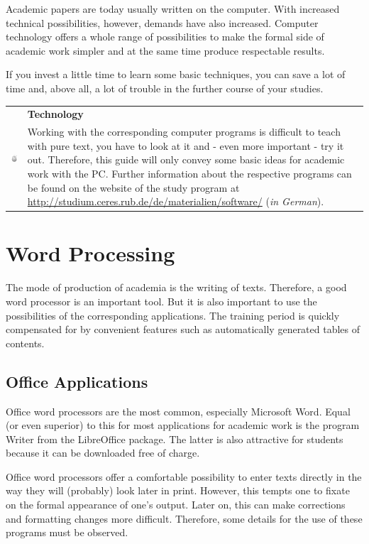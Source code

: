 \documentclass[
  english,
]{scrreprt}
\newlength{\iconwidth}
\newenvironment{displaybox}[2]{%
    \begin{center}
        \setlength\arrayrulewidth{0.75pt}%
        \arrayrulecolor{white}%
        \renewcommand{\arraystretch}{1.3}%
        \begin{tabular}{p{\iconwidth}p{\linewidth-4\tabcolsep-\iconwidth}}
            \multirow{2}{*}{#2}&\cellcolor{boxheadcol}\textbf{\sffamily\color{white}#1} \\%
            \hhline{~-}%
            &\cellcolor{boxcol}%
}{%
            \\
        \end{tabular}
        \arrayrulecolor{black}
    \end{center}
}
\newenvironment{Technology}{%
\begin{displaybox}{Technology}{\includegraphics[width=\iconwidth]{images/icon-technik}}}%
{\end{displaybox}}
\begin{document}
Academic papers are today usually written on the computer. With increased technical possibilities, however, demands have also increased. Computer technology offers a whole range of possibilities to make the formal side of academic work simpler and at the same time produce respectable results.

If you invest a little time to learn some basic techniques, you can save a lot of time and, above all, a lot of trouble in the further course of your studies.

\begin{Technology}

Working with the corresponding computer programs is difficult to teach with pure text, you have to look at it and - even more important - try it out. Therefore, this guide will only convey some basic ideas for academic work with the PC. Further information about the respective programs can be found on the website of the study program at \url{http://studium.ceres.rub.de/de/materialien/software/} (\emph{in German}).

\end{Technology}

\chapter{Word Processing}\label{sec:word_processing}

The mode of production of academia is the writing of texts. Therefore, a good word processor is an important tool. But it is also important to use the possibilities of the corresponding applications. The training period is quickly compensated for by convenient features such as automatically generated tables of contents.

\section{Office Applications}\label{sec:office}

Office word processors are the most common, especially Microsoft Word. Equal (or even superior) to this for most applications for academic work is the program Writer from the LibreOffice package. The latter is also attractive for students because it can be downloaded free of charge.

Office word processors offer a comfortable possibility to enter texts directly in the way they will (probably) look later in print. However, this tempts one to fixate on the formal appearance of one’s output. Later on, this can make corrections and formatting changes more difficult. Therefore, some details for the use of these programs must be observed.
\end{document}
